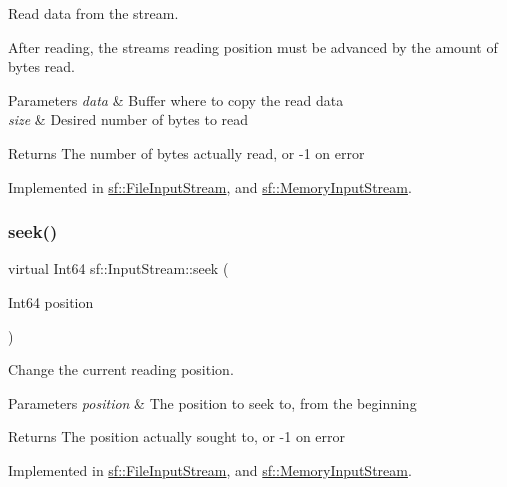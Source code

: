 Read data from the stream. 

After reading, the stream\textquotesingle{}s reading position must be advanced by the amount of bytes read.


\begin{DoxyParams}{Parameters}
{\em data} & Buffer where to copy the read data \\
\hline
{\em size} & Desired number of bytes to read\\
\hline
\end{DoxyParams}
\begin{DoxyReturn}{Returns}
The number of bytes actually read, or -\/1 on error 
\end{DoxyReturn}


Implemented in \hyperlink{classsf_1_1_file_input_stream_ad1e94c4152429f485db224c44ee1eb50}{sf\+::\+File\+Input\+Stream}, and \hyperlink{classsf_1_1_memory_input_stream_adff5270c521819639154d42d76fd4c34}{sf\+::\+Memory\+Input\+Stream}.

\mbox{\label{classsf_1_1_input_stream_a76aba8e5d5cf9b1c5902d5e04f7864fc}} 
\subsubsection{\texorpdfstring{seek()}{seek()}}
{\footnotesize\ttfamily virtual Int64 sf\+::\+Input\+Stream\+::seek (\begin{DoxyParamCaption}\item[{Int64}]{position }\end{DoxyParamCaption})\hspace{0.3cm}{\ttfamily [pure virtual]}}



Change the current reading position. 


\begin{DoxyParams}{Parameters}
{\em position} & The position to seek to, from the beginning\\
\hline
\end{DoxyParams}
\begin{DoxyReturn}{Returns}
The position actually sought to, or -\/1 on error 
\end{DoxyReturn}


Implemented in \hyperlink{classsf_1_1_file_input_stream_abdaf5700d4e1de07568e7829106b4eb9}{sf\+::\+File\+Input\+Stream}, and \hyperlink{classsf_1_1_memory_input_stream_aa2ac8fda2bdb4c95248ae90c71633034}{sf\+::\+Memory\+Input\+Stream}.

